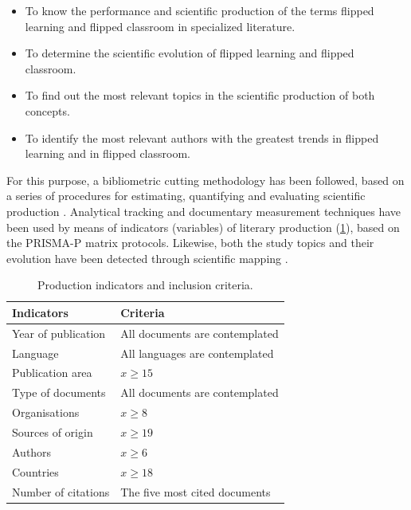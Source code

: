 \documentclass{textolivre}
\begin{document}
\begin{itemize}
    \item To know the performance and scientific production of the terms flipped learning and flipped classroom in specialized literature.
    \item To determine the scientific evolution of flipped learning and flipped classroom.
    \item To find out the most relevant topics in the scientific production of both concepts.
    \item To identify the most relevant authors with the greatest trends in flipped learning and in flipped classroom.
\end{itemize}

For this purpose, a bibliometric cutting methodology has been followed, based on a series of procedures for estimating, quantifying and evaluating scientific production \cite{martinez_analyzing_2015}. Analytical tracking and documentary measurement techniques have been used by means of indicators (variables) of literary production (\cref{tbl-tabela-01}), based on the PRISMA-P matrix protocols. Likewise, both the study topics and their evolution have been detected through scientific mapping \cite{lopez-robles_profesional_2019, lopez_belmonte_analysis_2019}.

\begin{table}[htpb]
\caption{Production indicators and inclusion criteria.}
\label{tbl-tabela-01}
\centering
\begin{tabular}{ll}
\toprule
\textbf{Indicators} & \textbf{Criteria}              \\ 
\midrule
Year of publication & All documents are contemplated \\ 
Language            & All languages are contemplated \\ 
Publication area    & $x \geq 15$                           \\ 
Type of documents   & All documents are contemplated \\ 
Organisations       & $x \geq 8$                            \\ 
Sources of origin   & $x \geq 19$                           \\ 
Authors             & $x \geq 6$                            \\ 
Countries           & $x \geq 18$                           \\ 
Number of citations & The five most cited documents  \\ 
\bottomrule
\end{tabular}
\end{table}
\end{document}
